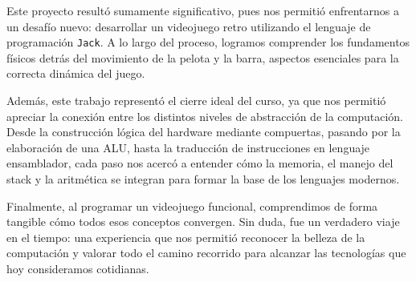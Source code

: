 \documentclass[twocolumn]{article}
\begin{document}
	Este proyecto resultó sumamente significativo, pues nos permitió enfrentarnos a un desafío nuevo: desarrollar un videojuego retro utilizando el lenguaje de programación \texttt{Jack}. 
	A lo largo del proceso, logramos comprender los fundamentos físicos detrás del movimiento de la pelota y la barra, aspectos esenciales para la correcta dinámica del juego.
	
	Además, este trabajo representó el cierre ideal del curso, ya que nos permitió apreciar la conexión entre los distintos niveles de abstracción de la computación. 
	Desde la construcción lógica del hardware mediante compuertas, pasando por la elaboración de una ALU, hasta la traducción de instrucciones en lenguaje ensamblador, cada paso nos acercó a entender cómo la memoria, el manejo del stack y la aritmética se integran para formar la base de los lenguajes modernos.
	
	Finalmente, al programar un videojuego funcional, comprendimos de forma tangible cómo todos esos conceptos convergen. 
	Sin duda, fue un verdadero viaje en el tiempo: una experiencia que nos permitió reconocer la belleza de la computación y valorar todo el camino recorrido para alcanzar las tecnologías que hoy consideramos cotidianas.
	
	
	
	
	
	
	
\end{document}
